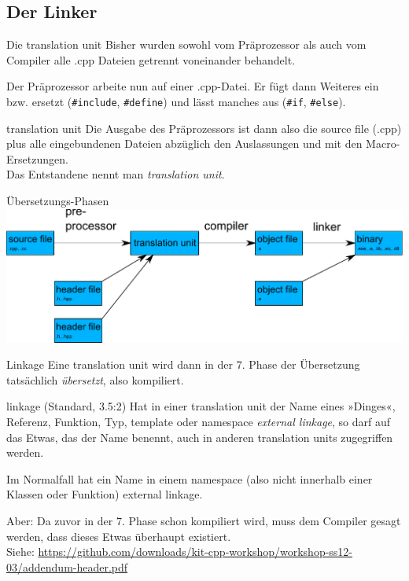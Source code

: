\subsection{Der Linker}

\begin{frame}[fragile]{Die translation unit}
	Bisher wurden sowohl vom Präprozessor als auch vom Compiler alle .cpp Dateien getrennt voneinander behandelt.
	
	Der Präprozessor arbeite nun auf einer .cpp-Datei. Er fügt dann Weiteres ein bzw. ersetzt (\verb|#include|, \verb|#define|) und lässt manches aus (\verb|#if|, \verb|#else|).
	
	\vspace{1em}
	
	\begin{block}{translation unit}
		Die Ausgabe des Präprozessors ist dann also die source file (.cpp) plus alle eingebundenen Dateien abzüglich den Auslassungen und mit den Macro-Ersetzungen.\\
		Das Entstandene nennt man \emph{translation unit}.
	\end{block}
\end{frame}

\begin{frame}[fragile]{Übersetzungs-Phasen}
	\includegraphics[width=\textwidth]{images/translation}
\end{frame}

\begin{frame}{Linkage}
	Eine translation unit wird dann in der 7. Phase der Übersetzung tatsächlich \emph{übersetzt}, also kompiliert.
	
	\vspace{1em}
	
	\begin{block}{linkage (Standard, 3.5:2)}
		Hat in einer translation unit der Name eines »Dinges«, Referenz, Funktion, Typ, template oder namespace \emph{external linkage}, so darf auf das Etwas, das der Name benennt, auch in anderen translation units zugegriffen werden.
	\end{block}
	Im Normalfall hat ein Name in einem namespace (also nicht innerhalb einer Klassen oder Funktion) external linkage.
	
	\vspace{1em}
	\pause
	
	Aber: Da zuvor in der 7. Phase schon kompiliert wird, muss dem Compiler gesagt werden, dass dieses Etwas überhaupt existiert.\\
	\tiny
	Siehe: \url{https://github.com/downloads/kit-cpp-workshop/workshop-ss12-03/addendum-header.pdf}
\end{frame}

